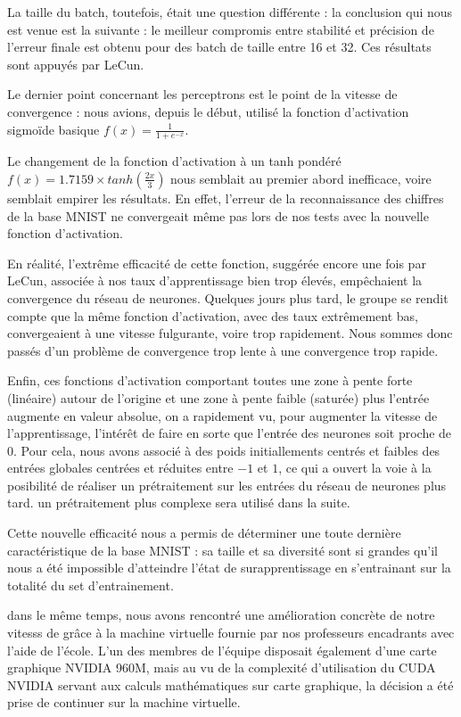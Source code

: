 \documentclass[
    10pt,
    a4paper,
    oneside,
    headinclude,footinclude,
    BCOR=5mm,
    captions=tableabove
]{scrartcl}
\begin{document}
La taille du batch, toutefois, était une question différente : la conclusion qui nous est venue est la suivante : le meilleur compromis entre stabilité et précision de l'erreur finale est obtenu pour des batch de taille entre 16 et 32. Ces résultats sont appuyés par LeCun. 

Le dernier point concernant les perceptrons est le point de la vitesse de convergence : nous avions, depuis le début, utilisé la fonction d'activation sigmoïde basique $f(x) = \frac{1}{1 + e^{-x}}$.
 
Le changement de la fonction d'activation à un tanh pondéré $f(x) = 1.7159 \times tanh(\frac{2x}{3})$
nous semblait au premier abord inefficace, voire semblait empirer les résultats. En effet, l'erreur de la reconnaissance des chiffres de la base MNIST ne convergeait même pas lors de nos tests avec la nouvelle fonction d'activation. 

En réalité, l'extrême efficacité de cette fonction, suggérée encore une fois par LeCun, associée à nos taux d'apprentissage bien trop élevés, empêchaient la convergence du réseau de neurones. Quelques jours plus tard, le groupe se rendit compte que la même fonction d'activation, avec des taux extrêmement bas, convergeaient à une vitesse fulgurante, voire trop rapidement. Nous sommes donc passés d'un problème de convergence trop lente à une convergence trop rapide. 

Enfin, ces fonctions d'activation comportant toutes une zone à pente forte (linéaire) autour de l'origine et une zone à pente faible (saturée) plus l'entrée augmente en valeur absolue, on a rapidement vu, pour augmenter la vitesse de l'apprentissage, l'intérêt de faire en sorte que l'entrée des neurones soit proche de $0$. Pour cela, nous avons associé à des poids initiallements centrés et faibles des entrées globales centrées et réduites entre $-1$ et $1$, ce qui a ouvert la voie à la posibilité de réaliser un prétraitement sur les entrées du réseau de neurones plus tard. un prétraitement plus complexe sera utilisé dans la suite. 


Cette nouvelle efficacité nous a permis de déterminer une toute dernière caractéristique de la base MNIST : sa taille et sa diversité sont si grandes qu'il nous a été impossible d'atteindre l'état de surapprentissage en s'entrainant sur la totalité du set d'entrainement.

dans le même temps, nous avons rencontré une amélioration concrète de notre vitesss de  grâce à la machine virtuelle fournie par nos professeurs encadrants avec l'aide de l'école. L'un des membres de l'équipe disposait également d'une carte graphique NVIDIA 960M, mais au vu de la complexité d'utilisation du CUDA NVIDIA servant aux calculs mathématiques sur carte graphique, la décision a été prise de continuer sur la machine virtuelle.
\end{document}
